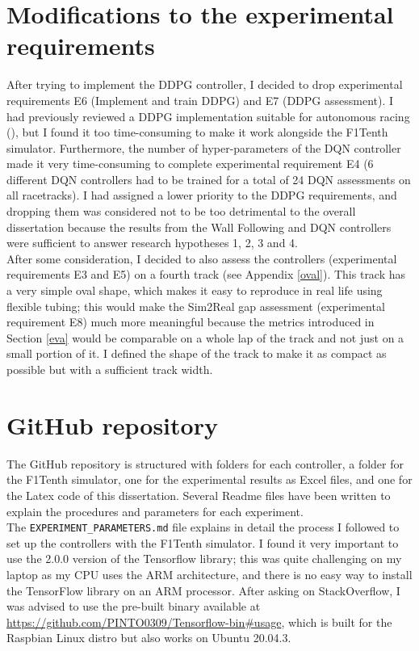 \section{Modifications to the experimental requirements}
After trying to implement the DDPG controller, I decided to drop experimental requirements E6 (Implement and train DDPG) and E7 (DDPG assessment). I had previously reviewed a DDPG implementation suitable for autonomous racing (\cite{Reference4}), but I found it too time-consuming to make it work alongside the F1Tenth simulator. Furthermore, the number of hyper-parameters of the DQN controller made it very time-consuming to complete experimental requirement E4 (6 different DQN controllers had to be trained for a total of 24 DQN assessments on all racetracks). I had assigned a lower priority to the DDPG requirements, and dropping them was considered not to be too detrimental to the overall dissertation because the results from the Wall Following and DQN controllers were sufficient to answer research hypotheses 1, 2, 3 and 4. \\
After some consideration, I decided to also assess the controllers (experimental requirements E3 and E5) on a fourth track (see Appendix \ref{oval}). This track has a very simple oval shape, which makes it easy to reproduce in real life using flexible tubing; this would make the Sim2Real gap assessment (experimental requirement E8) much more meaningful because the metrics introduced in Section \ref{eva} would be comparable on a whole lap of the track and not just on a small portion of it. I defined the shape of the track to make it as compact as possible but with a sufficient track width. \\
\section{GitHub repository}
The GitHub repository is structured with folders for each controller, a folder for the F1Tenth simulator, one for the experimental results as Excel files, and one for the Latex code of this dissertation. Several Readme files have been written to explain the procedures and parameters for each experiment. \\
The \verb|EXPERIMENT_PARAMETERS.md| file explains in detail the process I followed to set up the controllers with the F1Tenth simulator. I found it very important to use the 2.0.0 version of the Tensorflow library; this was quite challenging on my laptop as my CPU uses the ARM architecture, and there is no easy way to install the TensorFlow library on an ARM processor. After asking on StackOverflow, I was advised to use the pre-built binary available at \url{https://github.com/PINTO0309/Tensorflow-bin#usage}, which is built for the Raspbian Linux distro but also works on Ubuntu 20.04.3. 

